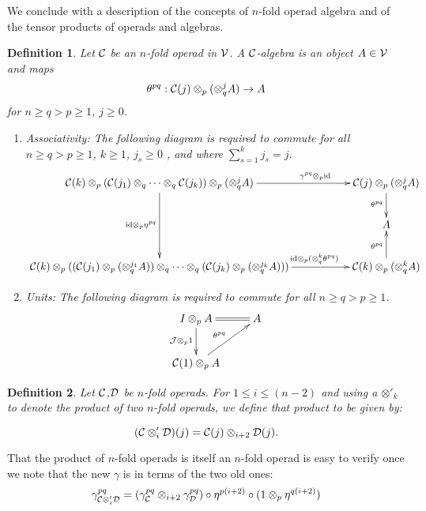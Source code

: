 \documentclass{tac}
\newtheorem{definition}{Definition}
\begin{document}
{      
We conclude with a description of the concepts of $n$-fold operad algebra and of the tensor products of operads
and algebras.
\begin{definition}\label{opalg}
Let ${\cal C}$ be  an $n$-fold operad in ${\cal V}$. A  ${\cal C}$-algebra is an object $A\in{\cal V}$ and maps
$$
\theta^{pq}:{\cal C}(j)\otimes_p(\otimes_q^j A)\to A
$$
for $n\ge q>p \ge 1$, $j\ge 0$. 
\begin{enumerate}
      \item Associativity: The following diagram is required to commute for all $n\ge q>p \ge 1$, 
      $k\ge 1$, $j_s\ge 0$ , and
      where $\sum\limits_{s=1}^k j_s = j.$
$$
\xymatrix{{\cal C}(k) \otimes_p ({\cal C}(j_1) \otimes_q \dots \otimes_q {\cal C}(j_k))\otimes_p(\otimes_q^j A)
\ar[rr]^>>>>>>>>>>>>{\gamma^{pq} \otimes_p \text{id}}
      \ar[dd]_{\text{id} \otimes_p \eta^{pq}}
  && {\cal C}(j)\otimes_p(\otimes_q^j A)
  \ar[d]_{\theta^{pq}}\\
  &&A\\
  {\cal C}(k) \otimes_p (({\cal C}(j_1)\otimes_p (\otimes_q^{j_1} A))\otimes_q \dots \otimes_q ({\cal C}(j_k)\otimes_p (\otimes_q^{j_k} A)))
  \ar[rr]^>>>>>>>>>>>>{\text{id} \otimes_p (\otimes_q^k \theta^{pq})}
  &&{\cal C}(k)\otimes_p(\otimes_q^k A)
  \ar[u]^{\theta^{pq}}
}
$$
\item Units: The following diagram is required to commute for all $n\ge q>p \ge 1$.
$$
\xymatrix{
      I\otimes_p A
      \ar[d]_{{\cal J}\otimes_p 1}
      \ar@{=}[r]^{}
      &A\\
      {\cal C}(1)\otimes_p A
      \ar[ur]^{\theta^{pq}}
      }
$$
\end{enumerate}
\end{definition}

\begin{definition}\label{tensor}
      Let ${\cal C}$,${\cal D}$ be  $n$-fold operads.
For $1 \le i \le (n-2)$ and using a $\otimes'_k$ to denote the product of
two $n$-fold operads, we define that product to be given by:

$$({\cal C}\otimes'_i {\cal D})(j) = {\cal C}(j) \otimes_{i+2} {\cal D}(j).$$

\end{definition}

That the product of $n$-fold operads is itself an $n$-fold operad is easy to verify once 
we note that the new $\gamma$ is in terms of the two old ones:
$$
\gamma^{pq}_{{\cal C}\otimes'_i {\cal D}} = 
(\gamma^{pq}_{{\cal C}}\otimes_{i+2}\gamma^{pq}_{{\cal D}})\circ \eta^{p(i+2)} \circ (1 \otimes_p \eta^{q(i+2)})
$$

}
\end{document}
